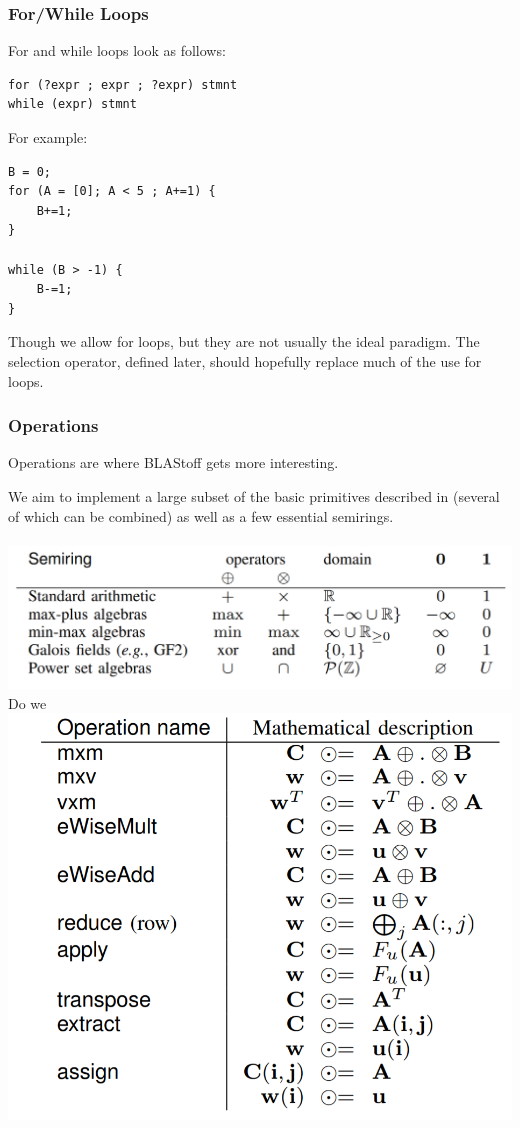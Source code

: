 \subsubsection{For/While Loops}
For and while loops look as follows:
\begin{lstlisting}
for (?expr ; expr ; ?expr) stmnt
while (expr) stmnt
\end{lstlisting}

For example:

\begin{lstlisting}
B = 0;
for (A = [0]; A < 5 ; A+=1) {
    B+=1;
}

while (B > -1) {
    B-=1;
}
\end{lstlisting}
Though we allow for loops, but they are not usually the ideal paradigm.  The selection operator, defined later,  should hopefully replace much of the use for loops.

\subsubsection{Operations}
Operations are where BLAStoff gets more interesting.

We aim to implement a large subset of the basic primitives described in \cite{Gilbert} (several of which can be combined) as well as a few essential semirings.\\\\
\label{sec:semirings}
\includegraphics[scale=0.3]{figures/common Semirings.png}\\Do we
\includegraphics[scale=0.3]{figures/BLAS primitives.png}\\

